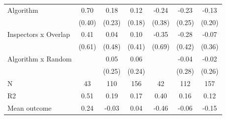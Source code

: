 \begin{tabular}{lccc|ccc}
Algorithm   &        0.70\sym{*}  &        0.18         &        0.12         &       -0.24         &       -0.23         &       -0.13         \\
            &      (0.40)         &      (0.23)         &      (0.18)         &      (0.38)         &      (0.25)         &      (0.20)         \\
\addlinespace
Inspectors x Overlap&        0.41         &        0.04         &        0.10         &       -0.35         &       -0.28         &       -0.07         \\
            &      (0.61)         &      (0.48)         &      (0.41)         &      (0.69)         &      (0.42)         &      (0.36)         \\
\addlinespace
Algorithm x Random&                     &        0.05         &        0.06         &                     &       -0.04         &       -0.02         \\
            &                     &      (0.25)         &      (0.24)         &                     &      (0.28)         &      (0.26)         \\
\midrule
N           &          43         &         110         &         156         &          42         &         112         &         157         \\
R2          &        0.51         &        0.19         &        0.17         &        0.40         &        0.16         &        0.12         \\
Mean outcome&        0.24         &       -0.03         &        0.04         &       -0.46         &       -0.06         &       -0.15         \\
\bottomrule \end{tabular}
